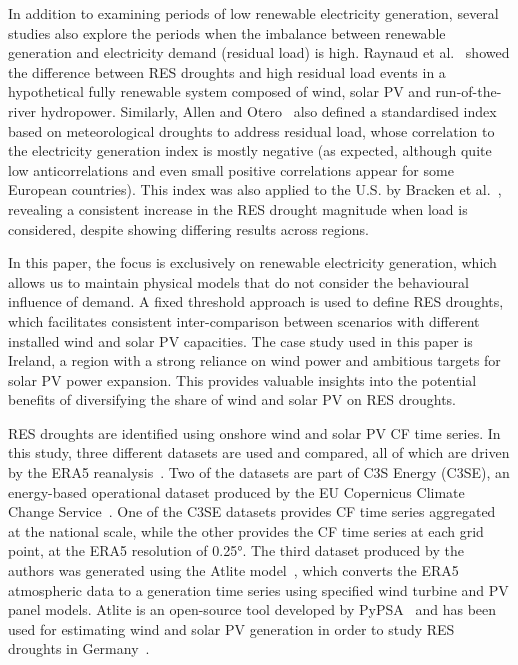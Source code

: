 \documentclass[preprint, 12pt]{elsarticle}
\begin{document}
In addition to examining periods of low renewable electricity generation, several studies also explore the periods when the imbalance between renewable generation and electricity demand (residual load) is high. Raynaud et al.~\citep{raynaud2018drought} showed the difference between RES droughts and high residual load events in a hypothetical fully renewable system composed of wind, solar PV and run-of-the-river hydropower. Similarly, Allen and Otero~\citep{allen2023drought} also defined a standardised index based on meteorological droughts to address residual load, whose correlation to the electricity generation index is mostly negative (as expected, although quite low anticorrelations and even small positive correlations appear for some European countries). This index was also applied to the U.S. by Bracken et al.~\citep{bracken2024drought}, revealing a consistent increase in the RES drought magnitude when load is considered, despite showing differing results across regions.

In this paper, the focus is exclusively on renewable electricity generation, which allows us to maintain physical models that do not consider the behavioural influence of demand. A fixed threshold approach is used to define RES droughts, which facilitates consistent inter-comparison between scenarios with different installed wind and solar PV capacities. The case study used in this paper is Ireland, a region with a strong reliance on wind power and ambitious targets for solar PV power expansion. This provides valuable insights into the potential benefits of diversifying the share of wind and solar PV on RES droughts.

RES droughts are identified using onshore wind and solar PV CF time series. In this study, three different datasets are used and compared, all of which are driven by the ERA5 reanalysis~\citep{hersbach2020era5}. Two of the datasets are part of C3S Energy (C3SE), an energy-based operational dataset produced by the EU Copernicus Climate Change Service~\citep{dubus2023energy}. One of the C3SE datasets provides CF time series aggregated at the national scale, while the other provides the CF time series at each grid point, at the ERA5 resolution of 0.25°. The third dataset produced by the authors was generated using the Atlite model~\citep{hofman2021atlite}, which converts the ERA5 atmospheric data to a generation time series using specified wind turbine and PV panel models. Atlite is an open-source tool developed by PyPSA~\citep{hofman2021atlite} and has been used for estimating wind and solar PV generation in order to study RES droughts in Germany~\citep{mockert2023drought}.
\end{document}
